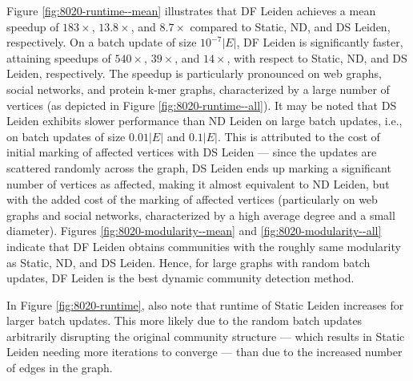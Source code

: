 Figure \ref{fig:8020-runtime--mean} illustrates that DF Leiden achieves a mean speedup of $183\times$, $13.8\times$, and $8.7\times$ compared to Static, ND, and DS Leiden, respectively. On a batch update of size $10^{-7}|E|$, DF Leiden is significantly faster, attaining speedups of $540\times$, $39\times$, and $14\times$, with respect to Static, ND, and DS Leiden, respectively. The speedup is particularly pronounced on web graphs, social networks, and protein k-mer graphs, characterized by a large number of vertices (as depicted in Figure \ref{fig:8020-runtime--all}). It may be noted that DS Leiden exhibits slower performance than ND Leiden on large batch updates, i.e., on batch updates of size $0.01|E|$ and $0.1|E|$. This is attributed to the cost of initial marking of affected vertices with DS Leiden --- since the updates are scattered randomly across the graph, DS Leiden ends up marking a significant number of vertices as affected, making it almost equivalent to ND Leiden, but with the added cost of the marking of affected vertices (particularly on web graphs and social networks, characterized by a high average degree and a small diameter). Figures \ref{fig:8020-modularity--mean} and \ref{fig:8020-modularity--all} indicate that DF Leiden obtains communities with the roughly same modularity as Static, ND, and DS Leiden. Hence, for large graphs with random batch updates, DF Leiden is the best dynamic community detection method.

In Figure \ref{fig:8020-runtime}, also note that runtime of Static Leiden increases for larger batch updates. This more likely due to the random batch updates arbitrarily disrupting the original community structure --- which results in Static Leiden needing more iterations to converge --- than due to the increased number of edges in the graph.
